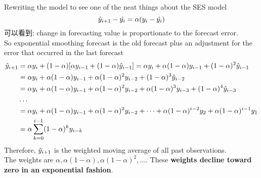 \documentclass{article}
\begin{document}
Rewriting the model to see one of the neat things about the SES model
$$\hat{y}_{i+1} - \hat{y_i} = \alpha (y_i - \hat{y_i})$$
可以看到: change in forecasting value is proportionate to the forecast error.\\
So exponential smoothing forecast is the old forecast plus an adjustment for the error that occurred in the last forecast
$$
\begin{aligned}
\hat{y}_{i+1}
& = \alpha y_i + (1 - \alpha) [\alpha y_{i-1} + (1-\alpha)\hat{y}_{i-1}] = \alpha y_i + \alpha (1 - \alpha) y_{i-1} + (1-\alpha)^2 \hat{y}_{i-1}\\
& = \alpha y_i + \alpha (1 - \alpha) y_{i-1} + \alpha (1-\alpha)^2 y_{i-2} + (1-\alpha)^3 \hat{y}_{i-2} \\
& = \alpha y_i + \alpha (1 - \alpha) y_{i-1} + \alpha (1-\alpha)^2 y_{i-2} + \alpha (1-\alpha)^3 y_{i-3} + (1-\alpha)^4 \hat{y}_{i-3} \\
& \ldots \\
& = \alpha y_i + \alpha (1 - \alpha) y_{i-1} + \alpha (1-\alpha)^2 y_{i-2} + \cdots + \alpha (1-\alpha)^{i-2} y_2 + \alpha (1-\alpha)^{i-1} y_1 \\
& = \alpha \sum_{k=0}^{i-1} (1-\alpha)^k y_{i-k}
\end{aligned}
$$
Therefore, $\hat{y}_{i+1}$ is the weighted moving average of all past observations. \\
The weights are $\alpha, \alpha(1-\alpha), \alpha(1-\alpha)^2, \ldots $.
These \textbf{weights decline toward zero in an exponential fashion}.
\end{document}
